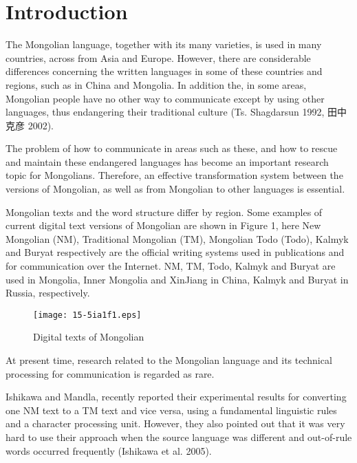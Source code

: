 \documentclass[english]{jnlp_1.4}
\begin{document}
\maketitle


\section{Introduction}

The Mongolian language, together with its many varieties, is used in many 
countries, across from Asia and Europe. However, there are considerable 
differences concerning the written languages in some of these countries and 
regions, such as in China and Mongolia. In addition the, in some areas, 
Mongolian people have no other way to communicate except by using other 
languages, thus endangering their traditional culture (Ts. Shagdarsun 1992, 
田中克彦 2002).

The problem of how to communicate in areas such as these, and how to rescue 
and maintain these endangered languages has become an important research 
topic for Mongolians. Therefore, an effective transformation system between 
the versions of Mongolian, as well as from Mongolian to other languages is 
essential.

Mongolian texts and the word structure differ by region. Some examples of 
current digital text versions of Mongolian are shown in Figure 1, here New 
Mongolian (NM), Traditional Mongolian (TM), Mongolian Todo (Todo), Kalmyk 
and Buryat respectively are the official writing systems used in 
publications and for communication over the Internet. NM, TM, Todo, Kalmyk 
and Buryat are used in Mongolia, Inner Mongolia and XinJiang in China, 
Kalmyk and Buryat in Russia, respectively.

\begin{figure}[t]
\centerline{\texttt{[image: 15-5ia1f1.eps]}}
\caption{Digital texts of Mongolian}
\label{fig1}
\end{figure}

At present time, research related to the Mongolian language and its 
technical processing for communication is regarded as rare.

Ishikawa and Mandla, recently reported their experimental results for 
converting one NM text to a TM text and vice versa, using a fundamental 
linguistic rules and a character processing unit. However, they also pointed 
out that it was very hard to use their approach when the source language was 
different and out-of-rule words occurred frequently (Ishikawa et al. 2005).
\end{document}
